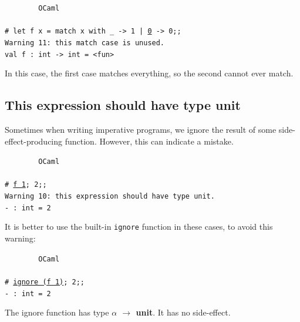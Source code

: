 \documentclass[]{book}
\newcommand{\smspace}{\vspace{4mm}}
\begin{document}
\smspace
\noindent\verb!        OCaml!\\
\noindent\\
\texttt{\# let f x = match x with \_ -> 1 | \underline{0} -> 0;;}\\
\texttt{Warning 11:\ this match case is unused.}\\
\texttt{val f :\ int -> int = <fun>}
\smspace

\noindent In this case, the first case matches everything, so the second cannot ever match.

\subsection*{This expression should have type unit}

Sometimes when writing imperative programs, we ignore the result of some side-effect-producing function. However, this can indicate a mistake.

\smspace
\noindent\verb!        OCaml!\\
\noindent\\
\texttt{\# \underline{f 1}; 2;;}\\                         
\texttt{Warning 10:\ this expression should have type unit.}\\
\texttt{- :\ int = 2}
\smspace

\noindent It is better to use the built-in \texttt{ignore} function in these cases, to avoid this warning:

\smspace
\noindent\verb!        OCaml!\\
\noindent\\
\texttt{\# \underline{ignore (f 1)}; 2;;}\\                         
\texttt{- :\ int = 2}
\smspace

\noindent The ignore function has type \textrm{\textbf{$\alpha$ $\rightarrow$ unit}}. It has no side-effect.

\lhead{}%
\printindex
\end{document}
